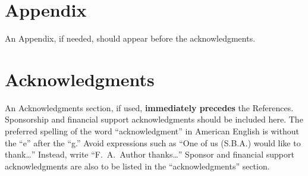 \section*{Appendix}

An Appendix, if needed, should appear before the acknowledgments.

\section*{Acknowledgments}
An Acknowledgments section, if used, \textbf{immediately precedes} the References. Sponsorship and financial support acknowledgments should be included here. The preferred spelling of the word ``acknowledgment'' in American English is without the ``e'' after the ``g.'' Avoid expressions such as ``One of us (S.B.A.) would like to thank\ldots'' Instead, write ``F.~A.~Author thanks\ldots'' Sponsor and financial support acknowledgments are also to be listed in the ``acknowledgments'' section.
